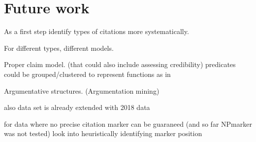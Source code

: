 \chapter{Future work}
As a first step identify types of citations more systematically.

For different types, different models.

Proper claim model. (that could also include assessing credibility\cite{Popat2016})
predicates could be grouped/clustered to represent functions as in \cite{Gabor2018}

Argumentative structures. (Argumentation mining\cite{Stab2016,Lippi2016,Habernal2017})

also data set is already extended with 2018 data\cite{Saier2019}

for data where no precise citation marker can be guaraneed (and so far NPmarker was not tested) look into heuristically identifying marker position
